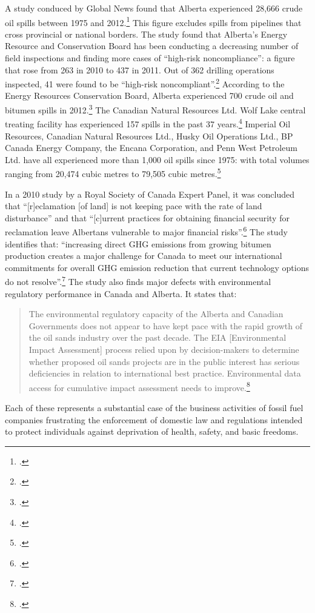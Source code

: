 A study conduced by Global News found that Alberta experienced 28,666 crude oil spills between 1975 and 2012.\footcite[][]{Young37Years}
This figure excludes spills from pipelines that cross provincial or national borders.
The study found that Alberta's Energy Resource and Conservation Board has been conducting a decreasing number of field inspections and finding more cases of ``high-risk noncompliance'': a figure that rose from 263 in 2010 to 437 in 2011.
Out of 362 drilling operations inspected, 41 were found to be ``high-risk noncompliant''.\footcite[][]{YoungPapernyRegulators}
According to the Energy Resources Conservation Board, Alberta experienced 700 crude oil and bitumen spills in 2012.\footcite[][]{YoungPapernyAnatomy}
The Canadian Natural Resources Ltd. Wolf Lake central treating facility has experienced 157 spills in the past 37 years.\footcite[][]{YoungPapernyAnatomy}
Imperial Oil Resources, Canadian Natural Resources Ltd., Husky Oil Operations Ltd., BP Canada Energy Company, the Encana Corporation, and Penn West Petroleum Ltd. have all experienced more than 1,000 oil spills since 1975: with total volumes ranging from 20,474 cubic metres to 79,505 cubic metres.\footcite[][]{YoungPapernyAnatomy}



In a 2010 study by a Royal Society of Canada Expert Panel, it was concluded that ``[r]eclamation [of land] is not keeping pace with the rate of land disturbance'' and that ``[c]urrent practices for obtaining financial security for reclamation leave Albertans vulnerable to major financial risks''.\footcite[][p. 5]{RoyalSocEnvHealth}
The study identifies that: ``increasing direct GHG emissions from growing bitumen production creates a major challenge for Canada to meet our international commitments for overall GHG emission reduction that current technology options do not resolve''.\footcite[][p. 5]{RoyalSocEnvHealth}
The study also finds major defects with environmental regulatory performance in Canada and Alberta.
It states that:
\begin{quote}
The environmental regulatory capacity of the Alberta and Canadian Governments does not appear to have kept pace with the rapid growth of the oil sands industry over the past decade. The EIA [Environmental Impact Assessment] process relied upon by decision-makers to determine whether proposed oil sands projects are in the public interest has serious deficiencies in relation to international best practice. Environmental data access for cumulative impact assessment needs to improve.\footcite[][p. 5]{RoyalSocEnvHealth}
\end{quote}
Each of these represents a substantial case of the business activities of fossil fuel companies frustrating the enforcement of domestic law and regulations intended to protect individuals against deprivation of health, safety, and basic freedoms.



